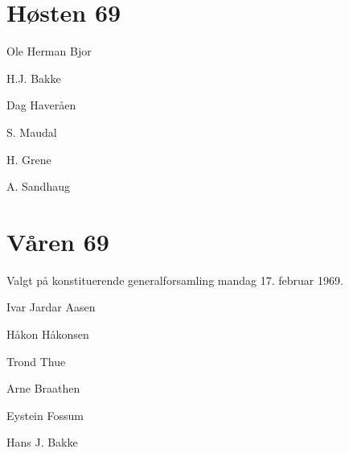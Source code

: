 \section*{Høsten 69}

\begin{description}
	\item[Leder] Ole Herman Bjor
	\item[Nestleder] H.J. Bakke
	\item[Sekretær] Dag Haveråen
	\item[Kasserer] S. Maudal
	\item H. Grene
	\item A. Sandhaug
\end{description}

\section*{Våren 69}

Valgt på konstituerende generalforsamling mandag 17. februar 1969.

\begin{description}
	\item[Leder] Ivar Jardar Aasen
	\item Håkon Håkonsen
	\item Trond Thue
	\item Arne Braathen
	\item Eystein Fossum
	\item Hans J. Bakke
\end{description}